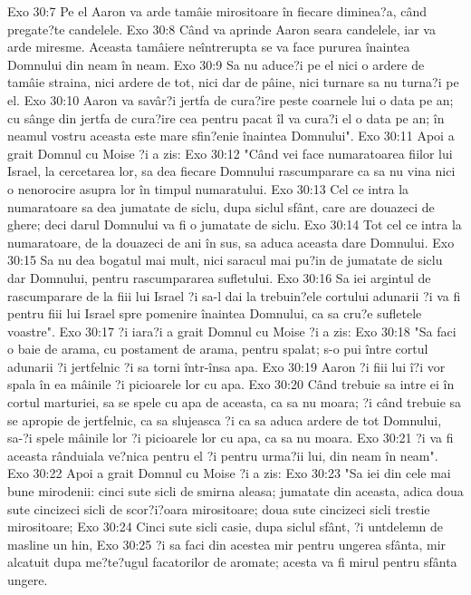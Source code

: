 Exo 30:7  Pe el Aaron va arde tamâie mirositoare în fiecare diminea?a, când pregate?te candelele.
Exo 30:8  Când va aprinde Aaron seara candelele, iar va arde miresme. Aceasta tamâiere neîntrerupta se va face pururea înaintea Domnului din neam în neam.
Exo 30:9  Sa nu aduce?i pe el nici o ardere de tamâie straina, nici ardere de tot, nici dar de pâine, nici turnare sa nu turna?i pe el.
Exo 30:10  Aaron va savâr?i jertfa de cura?ire peste coarnele lui o data pe an; cu sânge din jertfa de cura?ire cea pentru pacat îl va cura?i el o data pe an; în neamul vostru aceasta este mare sfin?enie înaintea Domnului".
Exo 30:11  Apoi a grait Domnul cu Moise ?i a zis:
Exo 30:12  "Când vei face numaratoarea fiilor lui Israel, la cercetarea lor, sa dea fiecare Domnului rascumparare ca sa nu vina nici o nenorocire asupra lor în timpul numaratului.
Exo 30:13  Cel ce intra la numaratoare sa dea jumatate de siclu, dupa siclul sfânt, care are douazeci de ghere; deci darul Domnului va fi o jumatate de siclu.
Exo 30:14  Tot cel ce intra la numaratoare, de la douazeci de ani în sus, sa aduca aceasta dare Domnului.
Exo 30:15  Sa nu dea bogatul mai mult, nici saracul mai pu?in de jumatate de siclu dar Domnului, pentru rascumpararea sufletului.
Exo 30:16  Sa iei argintul de rascumparare de la fiii lui Israel ?i sa-l dai la trebuin?ele cortului adunarii ?i va fi pentru fiii lui Israel spre pomenire înaintea Domnului, ca sa cru?e sufletele voastre".
Exo 30:17  ?i iara?i a grait Domnul cu Moise ?i a zis:
Exo 30:18  "Sa faci o baie de arama, cu postament de arama, pentru spalat; s-o pui între cortul adunarii ?i jertfelnic ?i sa torni într-însa apa.
Exo 30:19  Aaron ?i fiii lui î?i vor spala în ea mâinile ?i picioarele lor cu apa.
Exo 30:20  Când trebuie sa intre ei în cortul marturiei, sa se spele cu apa de aceasta, ca sa nu moara; ?i când trebuie sa se apropie de jertfelnic, ca sa slujeasca ?i ca sa aduca ardere de tot Domnului, sa-?i spele mâinile lor ?i picioarele lor cu apa, ca sa nu moara.
Exo 30:21  ?i va fi aceasta rânduiala ve?nica pentru el ?i pentru urma?ii lui, din neam în neam".
Exo 30:22  Apoi a grait Domnul cu Moise ?i a zis:
Exo 30:23  "Sa iei din cele mai bune mirodenii: cinci sute sicli de smirna aleasa; jumatate din aceasta, adica doua sute cincizeci sicli de scor?i?oara mirositoare; doua sute cincizeci sicli trestie mirositoare;
Exo 30:24  Cinci sute sicli casie, dupa siclul sfânt, ?i untdelemn de masline un hin,
Exo 30:25  ?i sa faci din acestea mir pentru ungerea sfânta, mir alcatuit dupa me?te?ugul facatorilor de aromate; acesta va fi mirul pentru sfânta ungere.
